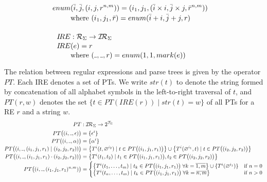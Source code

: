 \documentclass[AMA,STIX1COL]{WileyNJD-v2}
\newcommand{\Xund}{\rule{.4em}{.4pt}}
\newcommand{\XI}{\mathcal{I}}
\newcommand{\XIR}{\XI\!\XR}
\newcommand{\XR}{\mathcal{R}}
\newcommand{\XT}{\mathcal{T}}
\newcommand{\PT}{PT}
\newcommand{\IRE}{I\!RE}
\begin{document}
\begin{align*}
\begin{aligned}
        \\[-0.2em]
        enum &(\bar{i}, \bar{j}, (i, j, r^{n,m})) = (i_1, j_1, (\bar{i} \times i, \bar{j} \times j, \bar{r}^{n,m})) \\[-0.2em]
            &\text{where }
                (i_1, j_1, \bar{r}) = enum(\bar{i} + i, \bar{j} + j, r)
        \\[-0.2em]
        \\[-0.2em]
        \IRE &: \XR_\Sigma \rightarrow \XIR_\Sigma \\[-0.2em]
        \IRE&(e) = r \\[-0.2em]
            &\text{where }(\Xund, \Xund, r) = enum(1, 1, mark(e))
        \\[-0.2em]
    \end{aligned}
    \end{align*}

The relation between regular expressions and parse trees is given by the operator $\PT$.
Each IRE denotes a set of PTs.
%
We write $str(t)$ to denote the string formed by concatenation of all alphabet symbols in the left-to-right traversal of $t$,
and $\PT(r, w)$ denotes the set $\big\{ t \in \PT(\IRE(r)) \mid str(t) = w \big\}$ of all PTs for a RE $r$ and a string $w$.
%
    \begin{align*}
        \PT &: \XIR_\Sigma \rightarrow 2^{\XT_\Sigma}
        \\
        \PT\big((i, \Xund, \epsilon)\big) &= \{ {\epsilon}^{i} \}
        \\[-0.2em]
        \PT\big((i, \Xund, \alpha)\big) &= \{ {\alpha}^{i} \}
        \\[-0.2em]
        \PT\big((i, \Xund, (i_1, j_1, r_1) \mid (i_2, j_2, r_2))\big) &=
            \big\{ {T}^{i}(t, \varnothing^{i_2}) \mid t \in \PT\big((i_1, j_1, r_1)\big) \big\} \cup
            \big\{ {T}^{i}(\varnothing^{i_1}, t) \mid t \in \PT\big((i_2, j_2, r_2)\big) \big\}
        \\[-0.2em]
        \PT\big((i, \Xund, (i_1, j_1, r_1) \cdot (i_2, j_2, r_2))\big) &=
            \big\{ {T}^{i}(t_1, t_2) \mid
                t_1 \in \PT\big((i_1, j_1, r_1)\big),
                t_2 \in \PT\big((i_2, j_2, r_2)\big)
            \big\} \\[-0.2em]
        \PT\big((i, \Xund, (i_1, j_1, r_1)^{n, m})\big) &=
            \begin{cases}
                \big\{ {T}^{i}(t_1, \dots, t_m) \mid t_k \in \PT\big((i_1, j_1, r_1)\big) \;
                    \forall k = \overline{1, m} \big\} \cup \{ {T}^{i}(\varnothing^{i_1}) \} &\text{if } n = 0 \\[-0.2em]
                \big\{ {T}^{i}(t_n, \dots, t_m) \mid t_k \in \PT\big((i_1, j_1, r_1)\big) \;
                    \forall k = \overline{n, m} \big\} &\text{if } n > 0
            \end{cases}
    \end{align*}
    \medskip
\end{document}
